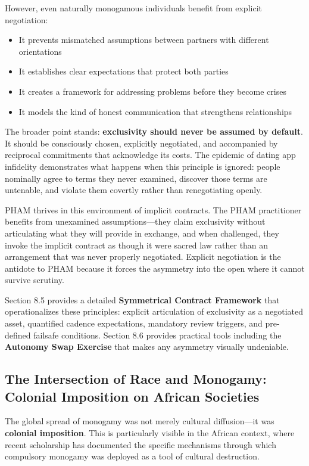 \documentclass[12pt,openany]{book}
\numberwithin{equation}{chapter}
\begin{document}
However, even naturally monogamous individuals benefit from explicit negotiation:
\begin{itemize}
    \item It prevents mismatched assumptions between partners with different orientations
    \item It establishes clear expectations that protect both parties
    \item It creates a framework for addressing problems before they become crises
    \item It models the kind of honest communication that strengthens relationships
\end{itemize}

The broader point stands: \textbf{exclusivity should never be assumed by default}. It should be consciously chosen, explicitly negotiated, and accompanied by reciprocal commitments that acknowledge its costs. The epidemic of dating app infidelity demonstrates what happens when this principle is ignored: people nominally agree to terms they never examined, discover those terms are untenable, and violate them covertly rather than renegotiating openly.

PHAM thrives in this environment of implicit contracts. The PHAM practitioner benefits from unexamined assumptions---they claim exclusivity without articulating what they will provide in exchange, and when challenged, they invoke the implicit contract as though it were sacred law rather than an arrangement that was never properly negotiated. Explicit negotiation is the antidote to PHAM because it forces the asymmetry into the open where it cannot survive scrutiny.

Section 8.5 provides a detailed \textbf{Symmetrical Contract Framework} that operationalizes these principles: explicit articulation of exclusivity as a negotiated asset, quantified cadence expectations, mandatory review triggers, and pre-defined failsafe conditions. Section 8.6 provides practical tools including the \textbf{Autonomy Swap Exercise} that makes any asymmetry visually undeniable.

\subsection{The Intersection of Race and Monogamy: Colonial Imposition on African Societies}

The global spread of monogamy was not merely cultural diffusion---it was \textbf{colonial imposition}. This is particularly visible in the African context, where recent scholarship has documented the specific mechanisms through which compulsory monogamy was deployed as a tool of cultural destruction.
\end{document}
